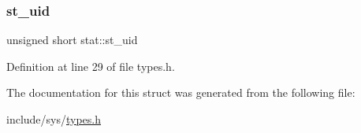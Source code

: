 \mbox{\label{structstat_a5d5f186135107ad27e7598919a40bdbd}} 
\subsubsection{\texorpdfstring{st\_uid}{st\_uid}}
{\footnotesize\ttfamily unsigned short stat\+::st\+\_\+uid}



Definition at line 29 of file types.\+h.



The documentation for this struct was generated from the following file\+:\begin{DoxyCompactItemize}
\item 
include/sys/\mbox{\hyperlink{types_8h}{types.\+h}}\end{DoxyCompactItemize}
